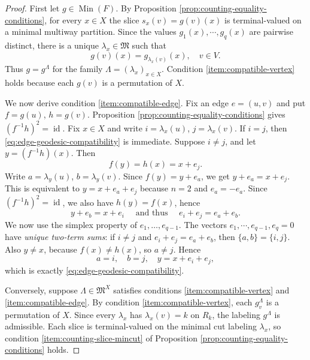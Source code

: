 \documentclass[11pt,oneside,letterpaper]{article}
\numberwithin{equation}{section}
\theoremstyle{definition}
\theoremstyle{remark}
\DeclareMathOperator{\id}{id}
\begin{document}
\begin{proof}
  First let $g\in\operatorname{Min}(F)$.  By Proposition
  \ref{prop:counting-equality-conditions}, for every $x\in X$ the slice
  $s_x(v)=g(v)(x)$ is terminal-valued on a minimal multiway partition.
  Since the values $g_1(x),\cdots,g_q(x)$ are pairwise distinct, there
  is a unique $\lambda_x\in\mathfrak{M}$ such that
  \begin{equation}
    g(v)(x)=g_{\lambda_x(v)}(x),\quad v\in V.
  \end{equation}
  Thus $g=g^\Lambda$ for the family
  $\Lambda=(\lambda_x)_{x\in X}$.  Condition
  \ref{item:compatible-vertex} holds because
  each $g(v)$ is a permutation of $X$.

  We now derive condition \ref{item:compatible-edge}.  Fix an edge
  $e=(u,v)$ and put $f=g(u)$, $h=g(v)$. Proposition \ref{prop:counting-equality-conditions} gives $(f^{-1}h)^2=\id$.  Fix $x\in X$ and write $i=\lambda_x(u)$, $j=\lambda_x(v)$. If $i=j$, then \eqref{eq:edge-geodesic-compatibility} is immediate.
  Suppose $i\ne j$, and let $y=(f^{-1}h)(x)$. Then
  \begin{equation}
    f(y)=h(x)=x+e_j.
  \end{equation}
  Write $a=\lambda_y(u)$, $b=\lambda_y(v)$. Since $f(y)=y+e_a$, we get $y+e_a=x+e_j$. This is equivalent to $y=x+e_a+e_j$ because $n=2$ and $e_a=-e_a$. Since $(f^{-1}h)^2=\id$, we also have $h(y)=f(x)$, hence
  \begin{equation}
    y+e_b=x+e_i \quad \text{ and thus } \quad e_i+e_j=e_a+e_b.
  \end{equation}
  We now use the simplex property of $e_1, \ldots, e_{q-1}$. The vectors $e_1,\cdots,e_{q-1},e_q=0$ have \emph{unique two-term sums}: if $i\ne j$ and $e_i+e_j=e_a+e_b$, then
  $\{a,b\}=\{i,j\}$.  Also $y\ne x$, because $f(x)\ne h(x)$, so
  $a\ne j$. Hence
  \begin{equation}
    a=i,\quad b=j,\quad y=x+e_i+e_j,
  \end{equation}
  which is exactly \eqref{eq:edge-geodesic-compatibility}.

  \medskip

  Conversely, suppose $\Lambda\in\mathfrak{M}^X$ satisfies
  conditions \ref{item:compatible-vertex} and
  \ref{item:compatible-edge}.  By condition
  \ref{item:compatible-vertex}, each $g_v^\Lambda$ is a permutation of
  $X$.  Since every $\lambda_x$ has
  $\lambda_x(v)=k$ on $R_k$, the labeling $g^\Lambda$ is admissible.
  Each slice is terminal-valued on the minimal cut labeling $\lambda_x$,
  so condition \ref{item:counting-slice-mincut} of Proposition
  \ref{prop:counting-equality-conditions} holds.


\end{proof}
\end{document}
